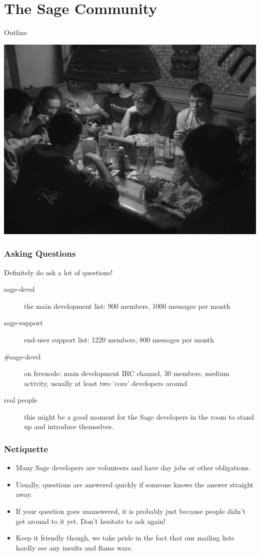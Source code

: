 \documentclass[11pt,blackandwhite]{beamer}
\begin{document}
\section{The Sage Community}

\begin{frame}{Outline}
\tableofcontents[sectionstyle=show/shaded]
\begin{flushright}
\includegraphics[height=0.3\textwidth]{community.jpg}
\end{flushright}
\end{frame}

\begin{frame}
\frametitle{Asking Questions} 

Definitely do ask a lot of questions!

\begin{description}
 \item[sage-devel] the main development list: 900 members, 1000 messages
per month
 \item[sage-support] end-user support list: 1220 members, 800 messages per
month 
 \item[\#sage-devel] on freenode: main development IRC channel, 30 members,
medium activity, usually at least two `core' developers around
 \item[real people] this might be a good moment for the Sage developers in the
room to stand up and introduce themselves.
\end{description}
\end{frame}

\begin{frame}
\frametitle{Netiquette}
\begin{itemize}
 \item Many Sage developers are volunteers and have day jobs or other
obligations.
 \item Usually, questions are answered quickly if someone knows the answer
straight away.
 \item If your question goes unanswered, it is probably just because people
didn't get around to it yet. Don't hesitate to ask again!
 \item Keep it friendly though, we take pride in the fact that our mailing lists
hardly see any insults and flame wars.
\end{itemize}
 
\end{frame}
\end{document}
